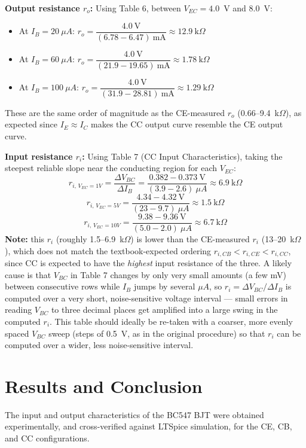 \documentclass[12pt,a4paper]{article}
\begin{document}
\textbf{Output resistance $r_o$:} Using Table 6, between $V_{EC}=4.0$~V and $8.0$~V:
\begin{itemize}
    \item At $I_B = 20\ \mu A$: $r_o = \dfrac{4.0\ \text{V}}{(6.78-6.47)\ \text{mA}} \approx 12.9\ \text{k}\Omega$
    \item At $I_B = 60\ \mu A$: $r_o = \dfrac{4.0\ \text{V}}{(21.9-19.65)\ \text{mA}} \approx 1.78\ \text{k}\Omega$
    \item At $I_B = 100\ \mu A$: $r_o = \dfrac{4.0\ \text{V}}{(31.9-28.81)\ \text{mA}} \approx 1.29\ \text{k}\Omega$
\end{itemize}
These are the same order of magnitude as the CE-measured $r_o$ (0.66--9.4~k$\Omega$), as expected since
$I_E\approx I_C$ makes the CC output curve resemble the CE output curve.

\textbf{Input resistance $r_i$:} Using Table 7 (CC Input Characteristics), taking the steepest reliable
slope near the conducting region for each $V_{EC}$:
\[
r_{i,\,V_{EC}=1V} = \frac{\Delta V_{BC}}{\Delta I_B} = \frac{0.382-0.373\ \text{V}}{(3.9-2.6)\ \mu A} \approx 6.9\ \text{k}\Omega
\]
\[
r_{i,\,V_{EC}=5V} = \frac{4.34-4.32\ \text{V}}{(23-9.7)\ \mu A} \approx 1.5\ \text{k}\Omega
\]
\[
r_{i,\,V_{EC}=10V} = \frac{9.38-9.36\ \text{V}}{(5.0-2.0)\ \mu A} \approx 6.7\ \text{k}\Omega
\]
\textbf{Note:} this $r_i$ (roughly 1.5--6.9~k$\Omega$) is lower than the CE-measured $r_i$
(13--20~k$\Omega$), which does not match the textbook-expected ordering $r_{i,CB}<r_{i,CE}<r_{i,CC}$,
since CC is expected to have the \emph{highest} input resistance of the three. A likely cause is that
$V_{BC}$ in Table 7 changes by only very small amounts (a few mV) between consecutive rows while $I_B$
jumps by several $\mu A$, so $r_i=\Delta V_{BC}/\Delta I_B$ is computed over a very short, noise-sensitive
voltage interval — small errors in reading $V_{BC}$ to three decimal places get amplified into a large
swing in the computed $r_i$. This table should ideally be re-taken with a coarser, more evenly spaced
$V_{BC}$ sweep (steps of 0.5~V, as in the original procedure) so that $r_i$ can be computed over a wider,
less noise-sensitive interval.
\section{Results and Conclusion}
The input and output characteristics of the BC547 BJT were obtained experimentally, and cross-verified
against LTSpice simulation, for the CE, CB, and CC configurations.
\end{document}
